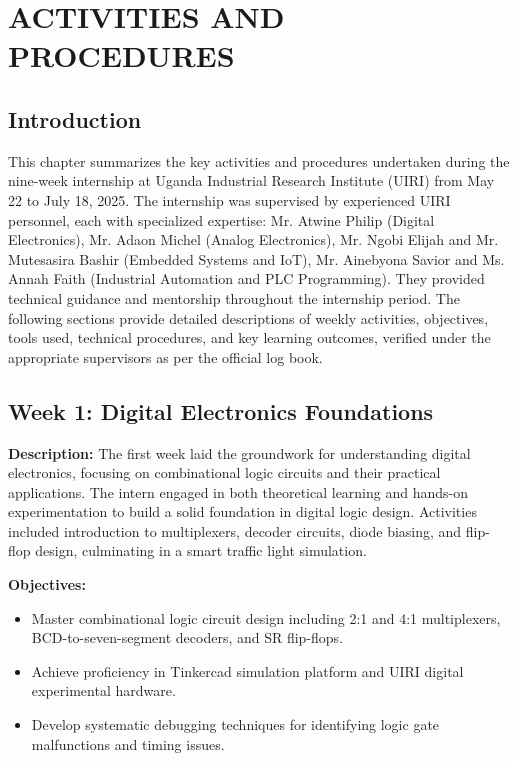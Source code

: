 \documentclass[12pt,a4paper]{report}
\begin{document}
\newpage
\chapter{ACTIVITIES AND PROCEDURES}

\section{Introduction}

\noindent This chapter summarizes the key activities and procedures undertaken during the nine-week internship at Uganda Industrial Research Institute (UIRI) from May 22 to July 18, 2025. The internship was supervised by experienced UIRI personnel, each with specialized expertise: Mr. Atwine Philip (Digital Electronics), Mr. Adaon Michel (Analog Electronics), Mr. Ngobi Elijah and Mr. Mutesasira Bashir (Embedded Systems and IoT), Mr. Ainebyona Savior and Ms. Annah Faith (Industrial Automation and PLC Programming). They provided technical guidance and mentorship throughout the internship period. The following sections provide detailed descriptions of weekly activities, objectives, tools used, technical procedures, and key learning outcomes, verified under the appropriate supervisors as per the official log book.

\section{Week 1: Digital Electronics Foundations}

\noindent\textbf{Description:} The first week laid the groundwork for understanding digital electronics, focusing on combinational logic circuits and their practical applications. The intern engaged in both theoretical learning and hands-on experimentation to build a solid foundation in digital logic design. Activities included introduction to multiplexers, decoder circuits, diode biasing, and flip-flop design, culminating in a smart traffic light simulation.

\noindent\textbf{Objectives:}
\begin{itemize}
    \item Master combinational logic circuit design including 2:1 and 4:1 multiplexers, BCD-to-seven-segment decoders, and SR flip-flops.
    \item Achieve proficiency in Tinkercad simulation platform and UIRI digital experimental hardware.
    \item Develop systematic debugging techniques for identifying logic gate malfunctions and timing issues.
\end{itemize}
\end{document}
